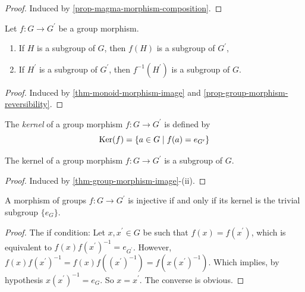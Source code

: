 \documentclass[12pt]{report}
\begin{document}
\begin{proof}
    Induced by \ref{prop-magma-morphism-composition}.
\end{proof}

\begin{theorem} \label{thm-group-morphism-image}
    Let $f \colon G \to G^{\prime}$ be a group morphism.
    \begin{enumerate}[label=(\roman*)]
        \item If $H$ is a subgroup of $G$, then $f(H)$ is a subgroup of $G^{\prime}$,
        \item If $H^{\prime}$ is a subgroup of $G^{\prime}$, then $f^{-1}(H^{\prime})$ is a subgroup of $G$.
    \end{enumerate}
\end{theorem}

\begin{proof}
    Induced by \ref{thm-monoid-morphism-image} and \ref{prop-group-morphism-reversibility}.
\end{proof}

\begin{definition} \label{def-group-morphism-kernel}
    The \emph{kernel} of a group morphism $f \colon G \to G^{\prime}$ is defined by
    \[
        \operatorname{Ker} (f) = \lbrace a \in G \mid f(a) = e_{G^{\prime}} \rbrace
    \]
\end{definition}

\begin{proposition} \label{prop-group-morphism-kernel-subgroup}
    The kernel of a group morphism $f \colon G \to G^{\prime}$ is a subgroup of $G$.
\end{proposition}

\begin{proof}
    Induced by \ref{thm-group-morphism-image}-(ii).
\end{proof}

\begin{proposition} \label{prop-group-morphism-inj-criterion}
    A morphism of groups $f \colon G \to G^{\prime}$ is injective if and only if its kernel is the trivial subgroup $\lbrace e_{G} \rbrace$.
\end{proposition}

\begin{proof}
    The if condition: Let $x, x^{\prime} \in G$ be such that $f(x) = f(x^{\prime})$, which is equivalent to $f(x) f(x^{\prime})^{-1} = e_{G^{\prime}}$. However, $f(x) f(x^{\prime})^{-1} = f(x) f((x^{\prime})^{-1}) = f(x (x^{\prime})^{-1})$. Which implies, by hypothesis $x (x^{\prime})^{-1} = e_{G}$. So $x = x^{\prime}$. The converse is obvious.
\end{proof}
\end{document}
